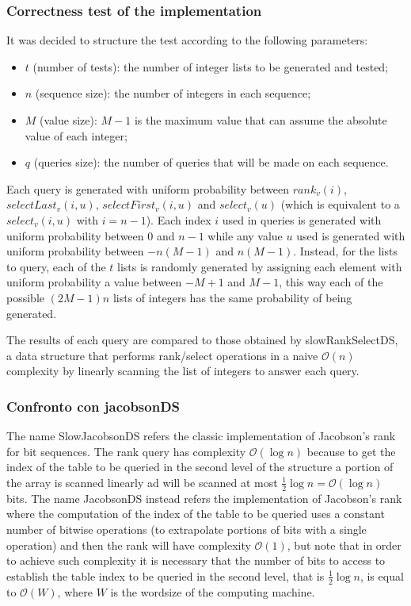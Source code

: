 \documentclass{article}
\begin{document}
\subsubsection{Correctness test of the implementation}
It was decided to structure the test according to the following parameters:
    \begin{itemize}
       \item $t$ (number of tests): the number of integer lists to be generated and tested;
        \item $n$ (sequence size):  the number of integers in each sequence;
        \item $M$ (value size): $M-1$ is the maximum value that can assume the absolute value of each integer;
        \item $q$ (queries size): the number of queries that will be made on each sequence.
    \end{itemize}
Each query is generated with uniform probability between $\mathit{rank}_v(i)$, $\mathit{selectLast}_v(i,u)$, $\mathit{selectFirst}_v(i,u)$ and $\mathit{select}_v(u)$ (which is equivalent to a $\mathit{select}_v(i,u)$ with $i=n-1$). Each index $i$ used in queries is generated with uniform probability between $0$ and $n-1$ while any value $u$ used is generated with uniform probability between $-n(M-1)$ and $n(M-1)$. Instead, for the lists to query, each of the $t$ lists is randomly generated by assigning each element with uniform probability a value between $-M+1$ and $M-1$, this way each of the possible $(2M-1)n$ lists of integers has the same probability of being generated.

The results of each query are compared to those obtained by slowRankSelectDS, a data structure that performs rank/select operations in a naive $\mathcal{O}(n)$ complexity by linearly scanning the list of integers to answer each query.

\subsubsection{Confronto con jacobsonDS}
The name SlowJacobsonDS refers the classic implementation of Jacobson’s rank for bit sequences. The rank query has complexity $\mathcal{O}(\log{n})$ because to get the index of the table to be queried in the second level of the structure a portion of the array is scanned linearly ad will be scanned at most $\frac{1}{2}\log{n} = \mathcal{O}(\log{n})$ bits. The name JacobsonDS instead refers the implementation of Jacobson's rank where the computation of the index of the table to be queried uses a constant number of bitwise operations (to extrapolate portions of bits with a single operation) and then the rank will have complexity $\mathcal{O}(1)$, but note that in order to achieve such complexity it is necessary that the number of bits to access to establish the table index to be queried in the second level, that is $\frac{1}{2}\log{n}$, is equal to $\mathcal{O}(W)$, where $W$ is the wordsize of the computing machine.
\end{document}
